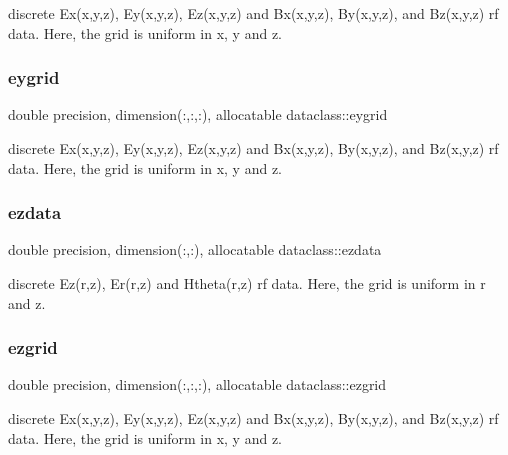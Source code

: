 discrete Ex(x,y,z), Ey(x,y,z), Ez(x,y,z) and Bx(x,y,z), By(x,y,z), and Bz(x,y,z) rf data. Here, the grid is uniform in x, y and z. 

\mbox{\label{namespacedataclass_a85c21f161fb74970fc84639092c193dd}} 
\subsubsection{\texorpdfstring{eygrid}{eygrid}}
{\footnotesize\ttfamily double precision, dimension(\+:,\+:,\+:), allocatable dataclass\+::eygrid}



discrete Ex(x,y,z), Ey(x,y,z), Ez(x,y,z) and Bx(x,y,z), By(x,y,z), and Bz(x,y,z) rf data. Here, the grid is uniform in x, y and z. 

\mbox{\label{namespacedataclass_a2f3f7950dbca31f394856d31781256f3}} 
\subsubsection{\texorpdfstring{ezdata}{ezdata}}
{\footnotesize\ttfamily double precision, dimension(\+:,\+:), allocatable dataclass\+::ezdata}



discrete Ez(r,z), Er(r,z) and Htheta(r,z) rf data. Here, the grid is uniform in r and z. 

\mbox{\label{namespacedataclass_aff9491f2e1258faccd2530eace979c78}} 
\subsubsection{\texorpdfstring{ezgrid}{ezgrid}}
{\footnotesize\ttfamily double precision, dimension(\+:,\+:,\+:), allocatable dataclass\+::ezgrid}



discrete Ex(x,y,z), Ey(x,y,z), Ez(x,y,z) and Bx(x,y,z), By(x,y,z), and Bz(x,y,z) rf data. Here, the grid is uniform in x, y and z. 

\mbox{\label{namespacedataclass_ac8605e11e3fc14fbebbc843cc36c2836}} 

